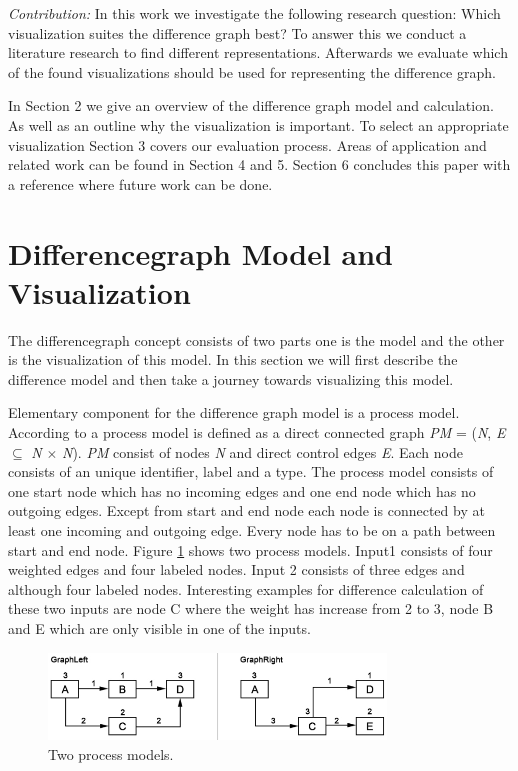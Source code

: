 \documentclass{llncs}
\begin{document}
\textit{Contribution:}
In this work we investigate the following research question: Which visualization suites the difference graph best? To answer this we conduct a literature research to find different representations. Afterwards we evaluate which of the found visualizations should be used for representing the difference graph.

In Section 2 we give an overview of the difference graph model and calculation. As well as an outline why the visualization is important. To select an appropriate visualization Section 3 covers our evaluation process. Areas of application and related work can be found in Section 4 and 5. Section 6 concludes this paper with a reference where future work can be done.


\section{Differencegraph Model and Visualization} %
\label{sec:DiffgraphModel}
The differencegraph concept \cite{lit:VisuApprDiffAnalysis} consists of two parts one is the model and the other is the visualization of this model. In this section we will  first describe the difference model and then take a journey towards visualizing this model.

Elementary component for the difference graph model is a process model. According to \cite{lit:VisuApprDiffAnalysis} a process model is defined as a direct connected graph \textit{PM} = (\textit{N}, \textit{E} $\subseteq$ \textit{N} $\times$ \textit{N}). \textit{PM} consist of nodes \textit{N} and direct control edges \textit{E}. Each node consists of an unique identifier, label and a type.
The process model consists of one start node which has no incoming edges and one end node which has no outgoing edges. Except from start and end node each node is connected by at least one incoming and outgoing edge. Every node has to be on a path between start and end node. Figure \ref{fig:ProcessModels} shows two process models. Input1 consists of four weighted edges and four labeled nodes. Input 2 consists of three edges and although four labeled nodes. Interesting examples for difference calculation of these two inputs are node C where the weight has increase from 2 to 3, node B and E which are only visible in one of the inputs.

\begin{figure}
	\centering
	\includegraphics[width=0.8\textwidth]{Images/ProcessModels.PNG}
	\caption{Two process models.}
	\label{fig:ProcessModels}
\end{figure}
\end{document}
